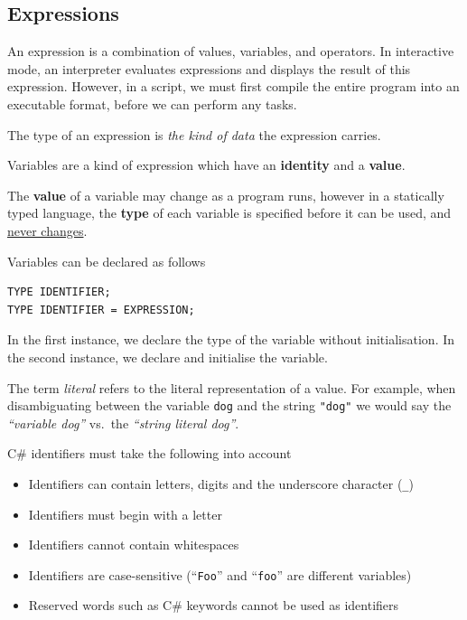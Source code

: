 \documentclass{article}
\begin{document}
\subsection{Expressions}
\begin{definition}[Expressions]
    An expression is a combination of values, variables, and operators.
    In interactive mode, an interpreter evaluates expressions and
    displays the result of this expression. However, in a script, we
    must first compile the entire program into an executable format,
    before we can perform any tasks.
\end{definition}
\begin{definition}[Type]
    The type of an expression is \textit{the kind of data} the expression carries.
\end{definition}
\begin{definition}[Variables]
    Variables are a kind of expression which have an \textbf{identity} and a \textbf{value}.

    The \textbf{value} of a variable may change as a program runs,
    however in a statically typed language, the \textbf{type} of each
    variable is specified before it can be used, and \underline{never
    changes}.

    Variables can be declared as follows
    \begin{verbatim}
TYPE IDENTIFIER;
TYPE IDENTIFIER = EXPRESSION;
\end{verbatim}
    In the first instance, we declare the type of the variable without
    initialisation. In the second instance, we declare and initialise
    the variable.
\end{definition}
\begin{definition}[Literal]
    The term \textit{literal} refers to the literal representation of a value.
    For example, when disambiguating between the variable \texttt{dog}
    and the string \texttt{"dog"} we would say the \emph{``variable dog''}
    vs.\ the \emph{``string literal dog''}.
\end{definition}
C\# identifiers must take the following into account
\begin{itemize}
    \item Identifiers can contain letters, digits and the underscore
          character (\texttt{_})
    \item Identifiers must begin with a letter
    \item Identifiers cannot contain whitespaces
    \item Identifiers are case-sensitive (``\texttt{Foo}''
          and ``\texttt{foo}'' are different variables)
    \item Reserved words such as C\# keywords cannot be used as
          identifiers
\end{itemize}
\end{document}
